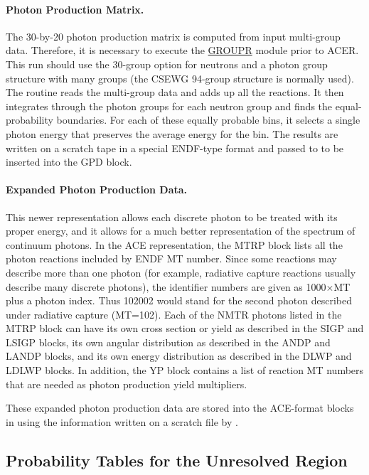 \paragraph{Photon Production Matrix.}
The 30-by-20 photon production matrix is computed from input
multi-group data.  Therefore, it is necessary to execute the
\hyperlink{sGROUPRhy}{GROUPR} module
prior to ACER.  This run should use the 30-group option
for neutrons and a photon group structure with many groups (the
CSEWG 94-group structure
is normally used).  The 
routine reads the multi-group data and adds up all the
reactions.  It then integrates through the photon groups
for each neutron group and finds the equal-probability
boundaries.  For each of these equally probable bins, it
selects a single photon energy that preserves the average
energy for the bin.  The results are written on a scratch
tape in a special ENDF-type format and passed to 
to be inserted into the GPD block.

\paragraph{Expanded Photon Production Data.}
This newer representation allows each discrete photon to be
treated with its proper energy, and it allows for a much better
representation of the spectrum of continuum photons.  In the
ACE representation, the MTRP block lists all the photon
reactions included by ENDF MT number.  Since some reactions
may describe more than one photon (for example, radiative
capture reactions usually describe many discrete photons),
the identifier numbers are given as 1000$\times$MT plus a photon
index.  Thus 102002 would stand for the second photon
described under radiative capture (MT=102).  Each of the
NMTR photons listed in the MTRP block can have its own
cross section or yield as described in the SIGP and LSIGP
blocks, its own angular distribution as described in the
ANDP and LANDP blocks, and its own energy distribution as
described in the DLWP and LDLWP blocks.  In addition,
the YP block contains a list of reaction MT numbers that
are needed as photon production yield multipliers.

These expanded photon production data are stored into the
ACE-format blocks in  using the information
written on a scratch file by .

\subsection{Probability Tables for the Unresolved Region}
\label{ssACER_URR_probtables}

